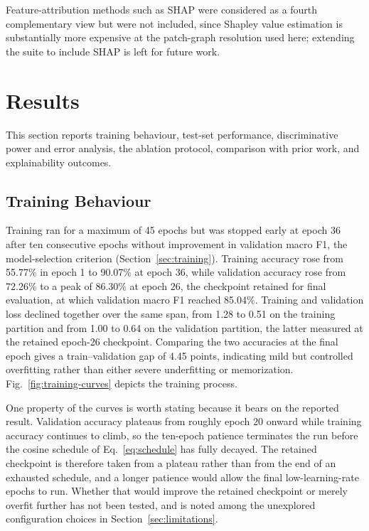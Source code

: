 \documentclass[journal]{IEEEtran}
\begin{document}
Feature-attribution methods such as SHAP \cite{lundberg2017unified} were
considered as a fourth complementary view but were not included, since Shapley
value estimation is substantially more expensive at the patch-graph resolution
used here; extending the suite to include SHAP is left for future work.

\section{Results}\label{results}
This section reports training behaviour, test-set performance, discriminative
power and error analysis, the ablation protocol, comparison with prior work, and
explainability outcomes.

\subsection{Training Behaviour}
Training ran for a maximum of 45 epochs but was stopped early at epoch 36 after
ten consecutive epochs without improvement in validation macro F1, the
model-selection criterion (Section~\ref{sec:training}). Training accuracy rose
from 55.77\% in epoch 1 to 90.07\% at epoch 36, while validation accuracy rose
from 72.26\% to a peak of 86.30\% at epoch 26, the checkpoint retained for final
evaluation, at which validation macro F1 reached 85.04\%. Training and
validation loss declined together over the same span, from 1.28 to 0.51 on the
training partition and from 1.00 to 0.64 on the validation partition, the latter
measured at the retained epoch-26 checkpoint. Comparing the two accuracies at
the final epoch gives a train--validation gap of 4.45 points, indicating mild
but controlled overfitting rather than either severe underfitting or
memorization. Fig.~\ref{fig:training-curves} depicts the training process.

One property of the curves is worth stating because it bears on the reported
result. Validation accuracy plateaus from roughly epoch 20 onward while training
accuracy continues to climb, so the ten-epoch patience terminates the run before
the cosine schedule of Eq.~\eqref{eq:schedule} has fully decayed. The retained
checkpoint is therefore taken from a plateau rather than from the end of an
exhausted schedule, and a longer patience would allow the final low-learning-rate
epochs to run. Whether that would improve the retained checkpoint or merely
overfit further has not been tested, and is noted among the unexplored
configuration choices in Section~\ref{sec:limitations}.
\end{document}
